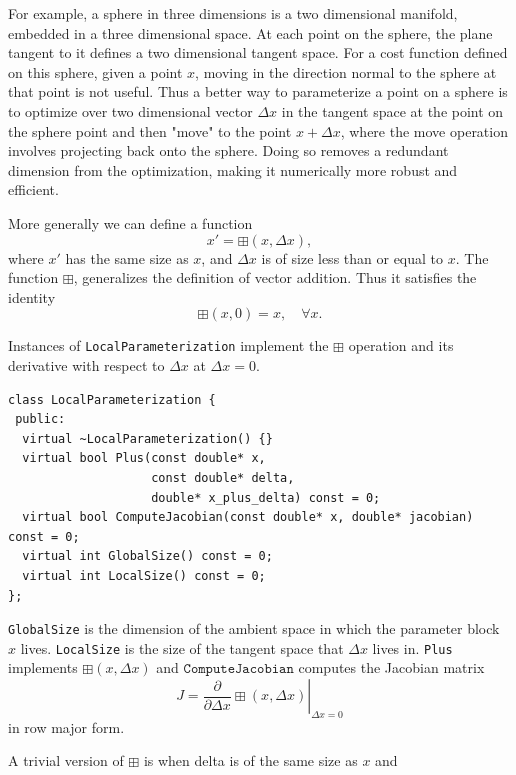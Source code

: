 For example, a sphere in three dimensions is a two dimensional
manifold, embedded in a three dimensional space. At each point on
the sphere, the plane tangent to it defines a two dimensional
tangent space. For a cost function defined on this sphere, given a
point $x$, moving in the direction normal to the sphere at that
point is not useful. Thus a better way to parameterize a point on
a sphere is to optimize over two dimensional vector $\Delta x$ in the
tangent space at the point on the sphere point and then "move" to
the point $x + \Delta x$, where the move operation involves projecting
back onto the sphere. Doing so removes a redundant dimension from
the optimization, making it numerically more robust and efficient.

More generally we can define a function
\begin{equation}
  x' = \boxplus(x, \Delta x),
\end{equation}
where $x'$ has the same size as $x$, and $\Delta x$ is of size less
than or equal to $x$. The function $\boxplus$, generalizes the
definition of vector addition. Thus it satisfies the identity
\begin{equation}
  \boxplus(x, 0) = x,\quad \forall x.
\end{equation}

Instances of \texttt{LocalParameterization} implement the $\boxplus$ operation and its derivative with respect to $\Delta x$ at $\Delta x = 0$.

\begin{verbatim}
class LocalParameterization {
 public:
  virtual ~LocalParameterization() {}
  virtual bool Plus(const double* x,
                    const double* delta,
                    double* x_plus_delta) const = 0;
  virtual bool ComputeJacobian(const double* x, double* jacobian) const = 0;
  virtual int GlobalSize() const = 0;
  virtual int LocalSize() const = 0;
};
\end{verbatim}

\texttt{GlobalSize} is the dimension of the ambient space in which the parameter block $x$ lives. \texttt{LocalSize} is the size of the tangent space that $\Delta x$ lives in. \texttt{Plus} implements $\boxplus(x,\Delta x)$ and $\texttt{ComputeJacobian}$ computes the Jacobian matrix
\begin{equation}
	J = \left . \frac{\partial }{\partial \Delta x} \boxplus(x,\Delta x)\right|_{\Delta x = 0}
\end{equation}
in row major form.

A trivial version of $\boxplus$ is when delta is of the same size as $x$
and

